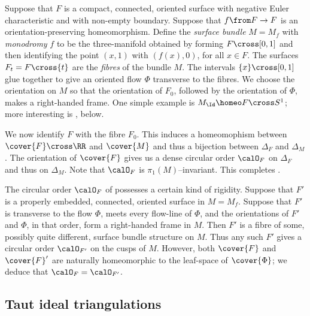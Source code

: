 \documentclass[12pt]{amsart}
\begin{document}
\begin{example}
\label{Exa:SurfaceBundlesOne}
Suppose that $F$ is a compact, connected, oriented surface with negative Euler characteristic and with non-empty boundary.  Suppose that $f \from F \to F$ is an orientation-preserving homeomorphism.  
Define the \emph{surface bundle} $M = M_f$ with \emph{monodromy} $f$ to be the three-manifold obtained by forming $F \cross [0,1]$ and then identifying the point $(x, 1)$ with $(f(x), 0)$, for all $x \in F$.  The surfaces $F_t = F \cross \{t\}$ are the \emph{fibres} of the bundle $M$.  The intervals $\{x\} \cross [0,1]$ glue together to give an oriented flow $\Phi$ transverse to the fibres.  We choose the orientation on $M$ so that the orientation of $F_0$, followed by the orientation of $\Phi$, makes a right-handed frame.  One simple example is $M_{\Id} \homeo F \cross S^1$; more interesting is , below. 

We now identify $F$ with the fibre $F_0$.  This induces a homeomophism between $\cover{F} \cross \RR$ and $\cover{M}$ and thus a bijection between $\Delta_F$ and $\Delta_M$.  The orientation of $\cover{F}$ gives us a dense circular order $\calO_F$ on $\Delta_F$ and thus on $\Delta_M$.  Note that $\calO_F$ is $\pi_1(M)$--invariant.
This completes . 
\end{example}

\begin{remark}
\label{Rem:BundleRigidity}
The circular order $\calO_F$ of  possesses a certain kind of rigidity.  Suppose that $F'$ is a properly embedded, connected, oriented surface in $M = M_f$.  Suppose that $F'$ is transverse to the flow $\Phi$, meets every flow-line of $\Phi$, and the orientations of $F'$ and $\Phi$, in that order, form a right-handed frame in $M$.
Then $F'$ is a fibre of some, possibly quite different, surface bundle structure on $M$.  
Thus any such $F'$ gives a circular order $\calO_{F'}$ on the cusps of $M$.  However, both $\cover{F}$ and $\cover{F}'$ are naturally homeomorphic to the leaf-space of $\cover{\Phi}$; we deduce that $\calO_F = \calO_{F'}$.
\end{remark}

\subsection{Taut ideal triangulations}
\label{Sec:TautIdealTriangulation}
\end{document}
